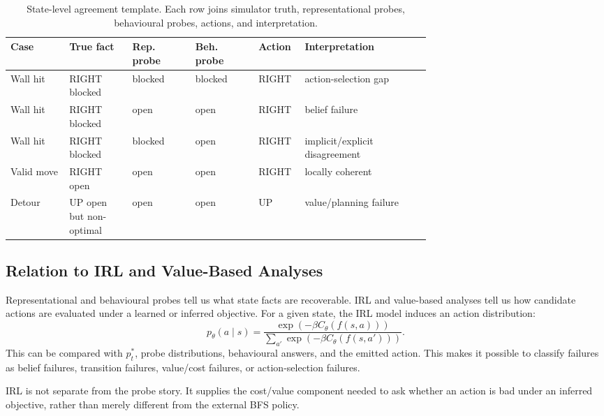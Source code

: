 \documentclass[11pt,a4paper]{article}
\begin{document}
\begin{table}[h]
\centering
\small
\begin{tabularx}{\linewidth}{p{0.14\linewidth}p{0.15\linewidth}p{0.15\linewidth}p{0.15\linewidth}p{0.11\linewidth}X}
\toprule
Case & True fact & Rep. probe & Beh. probe & Action & Interpretation \\
\midrule
Wall hit & RIGHT blocked & blocked & blocked & RIGHT & action-selection gap \\
Wall hit & RIGHT blocked & open & open & RIGHT & belief failure \\
Wall hit & RIGHT blocked & blocked & open & RIGHT & implicit/explicit disagreement \\
Valid move & RIGHT open & open & open & RIGHT & locally coherent \\
Detour & UP open but non-optimal & open & open & UP & value/planning failure \\
\bottomrule
\end{tabularx}
\caption{State-level agreement template. Each row joins simulator truth, representational probes, behavioural probes, actions, and interpretation.}
\label{tab:state-level-agreement}
\end{table}

\subsection{Relation to IRL and Value-Based Analyses}

Representational and behavioural probes tell us what state facts are recoverable. IRL and value-based analyses tell us how candidate actions are evaluated under a learned or inferred objective. For a given state, the IRL model induces an action distribution:
\[
p_\theta(a\mid s)=\frac{\exp(-\beta C_\theta(f(s,a)))}{\sum_{a'}\exp(-\beta C_\theta(f(s,a')))}.
\]
This can be compared with $p_t^*$, probe distributions, behavioural answers, and the emitted action. This makes it possible to classify failures as belief failures, transition failures, value/cost failures, or action-selection failures.

\begin{insight}
IRL is not separate from the probe story. It supplies the cost/value component needed to ask whether an action is bad under an inferred objective, rather than merely different from the external BFS policy.
\end{insight}

\end{document}
